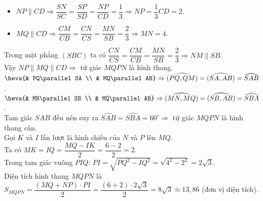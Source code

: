 \begin{ex}
{\begin{itemize}
			\item [\color{teal}\faCheckCircleO] $NP\parallel CD\Rightarrow\dfrac{SN}{SC}=\dfrac{SP}{SD}=\dfrac{NP}{CD}=\dfrac{1}{3}\Rightarrow NP=\dfrac{1}{3}CD=2$.
			\item [\color{teal}\faCheckCircleO] $MQ\parallel CD\Rightarrow\dfrac{CM}{CB}=\dfrac{CN}{CS}=\dfrac{MN}{SB}=\dfrac{2}{3}\Rightarrow MN=4$.
		\end{itemize}
		Trong mặt phẳng $(SBC)$ ta có $\dfrac{CN}{CS}=\dfrac{CM}{CB}=\dfrac{MN}{SB}=\dfrac{2}{3}\Rightarrow NM\parallel SB$.\\
		Vậy $NP\parallel MQ\parallel CD\Rightarrow $ tứ giác $MQPN$ là hình thang.\\
		$\heva{& PQ\parallel SA \\ & MQ\parallel AB}\Rightarrow\widehat{\left(PQ,QM\right)}=\widehat{\left(SA,AB\right)}=\widehat{SAB}$.\\
		$\heva{& MN\parallel SB \\ & MQ\parallel AB}\Rightarrow\widehat{\left(MN,MQ\right)}=\widehat{\left(SB,AB\right)}=\widehat{SBA}$.\\
		Tam giác $SAB$ đều nên suy ra $\widehat{SAB}=\widehat{SBA}=60^\circ\Rightarrow$ tứ giác $MQPN$ là hình thang cân.\\
		Gọi $K$ và $I$ lần lượt là hình chiếu của $N$ và $P$ lên $MQ$. \\
		Ta có $MK=IQ=\dfrac{MQ-IK}{2}=\dfrac{6-2}{2}=2$.\\
		Trong tam giác vuông $PIQ$: $PI=\sqrt{PQ^2-IQ^2}=\sqrt{4^2-2^2}=2\sqrt{3}$.\\
		Diện tích hình thang $MQPN$ là $S_{MQPN}=\dfrac{\left(MQ+NP\right)\cdot PI}{2}=\dfrac{\left(6+2\right)\cdot 2\sqrt{3}}{2}=8\sqrt{3}\approx 13{,}86$ (đơn vị diện tích).
	}
\end{ex}

